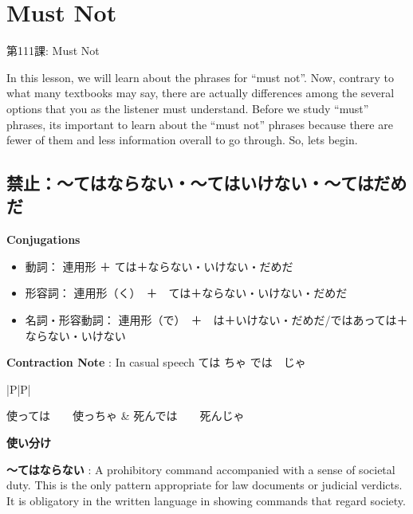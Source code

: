     
\chapter{Must Not}

\begin{center}
\begin{Large}
第111課: Must Not 
\end{Large}
\end{center}
 
\par{ In this lesson, we will learn about the phrases for “must not”. Now, contrary to what many textbooks may say, there are actually differences among the several options that you as the listener must understand. Before we study “must” phrases, it\textquotesingle s important to learn about the “must not” phrases because there are fewer of them and less information overall to go through. So, let\textquotesingle s begin.  }
      
\section{禁止：～てはならない・～てはいけない・～てはだめだ}
 
\begin{center}
\textbf{Conjugations }
\end{center}

\begin{itemize}

\item 動詞： 連用形 ＋ ては＋ならない・いけない・だめだ 
\item 形容詞： 連用形（く）　＋　ては＋ならない・いけない・だめだ 
\item 名詞・形容動詞： 連用形（で）　＋　は＋いけない・だめだ\slash ではあっては＋ならない・いけない 
\end{itemize}
\textbf{Contraction Note }: In casual speech ては \textrightarrow  ちゃ では　\textrightarrow じゃ 
\begin{ltabulary}{|P|P|}
\hline 

使っては　\textrightarrow 　使っちゃ & 死んでは　\textrightarrow 　死んじゃ \\ 

\end{ltabulary}

\begin{center}
 \textbf{使い分け }
\end{center}

\par{\textbf{～てはならない }: A prohibitory command accompanied with a sense of societal duty. This is the only pattern appropriate for law documents or judicial verdicts. It is obligatory in the written language in showing commands that regard society. }

